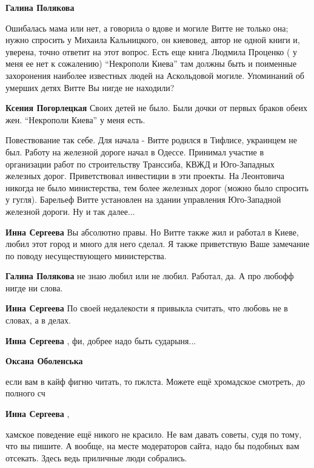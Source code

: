 \begin{itemize}
\begin{itemize}
\textbf{Галина Полякова} 

Ошибалась мама или нет, а говорила о вдове и могиле Витте не только она; нужно
спросить у Михаила Кальницкого, он киевовед, автор не одной книги и, уверена,
точно ответит на этот вопрос. Есть еще книга Людмила Проценко ( у меня ее нет к
сожалению) \enquote{Некрополи Киева} там должны быть и поименные захоронения наиболее
известных людей на Аскольдовой могиле. Упоминаний об умерших детях Витте Вы
нигде не находили?

\textbf{Ксения Погорлецкая} Своих детей не было. Были дочки от первых браков обеих жен. \enquote{Некрополи Киева} у меня есть.
\end{itemize} %

Повествование так себе.
Для начала - Витте родился в Тифлисе, украинцем не был.
Работу на железной дороге начал в Одессе. Принимал участие в организации работ по строительству Транссиба, КВЖД и Юго-Западных железных дорог. Приветствовал инвестиции в эти проекты.
На Леонтовича никогда не было министерства, тем более железных дорог (можно было спросить у гугля).
Барельеф Витте установлен на здании управления Юго-Западной железной дороги.
Ну и так далее...

\begin{itemize} %
\textbf{Инна Сергеева} Вы абсолютно правы. Но Витте также жил и работал в Киеве, любил этот город и много для него сделал. Я также приветствую Ваше замечание по поводу несуществующего министерства.

\begin{itemize} %
\textbf{Галина Полякова} не знаю любил или не любил. Работал, да. А про любофф нигде ни слова.

\textbf{Инна Сергеева} По своей недалекости я привыкла считать, что любовь не в словах, а в делах.

\textbf{Инна Сергеева} , фи, добрее надо быть сударыня...

\textbf{Оксана Оболенська} 

если вам в кайф фигню читать, то пжлста. Можете ещё хромадское смотреть, до полного сч

\textbf{Инна Сергеева} , 

хамское поведение ещё никого не красило. Не вам давать советы, судя по тому,
что вы пишите. А вообще, на месте модераторов сайта, надо бы подобных вам
отсекать. Здесь ведь приличные люди собрались.


\end{itemize}
\end{itemize}
\end{itemize}
